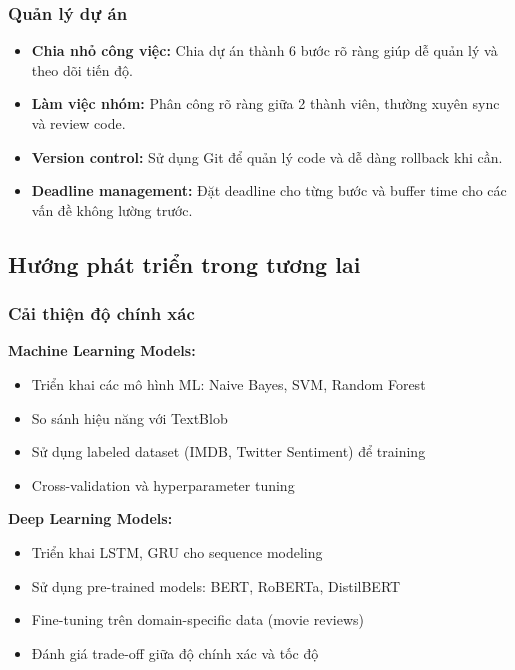 \subsubsection{Quản lý dự án}
\begin{itemize}
    \item \textbf{Chia nhỏ công việc:} Chia dự án thành 6 bước rõ ràng giúp dễ quản lý và theo dõi tiến độ.
    
    \item \textbf{Làm việc nhóm:} Phân công rõ ràng giữa 2 thành viên, thường xuyên sync và review code.
    
    \item \textbf{Version control:} Sử dụng Git để quản lý code và dễ dàng rollback khi cần.
    
    \item \textbf{Deadline management:} Đặt deadline cho từng bước và buffer time cho các vấn đề không lường trước.
\end{itemize}

\subsection{Hướng phát triển trong tương lai}

\subsubsection{Cải thiện độ chính xác}

\textbf{Machine Learning Models:}
\begin{itemize}
    \item Triển khai các mô hình ML: Naive Bayes, SVM, Random Forest
    \item So sánh hiệu năng với TextBlob
    \item Sử dụng labeled dataset (IMDB, Twitter Sentiment) để training
    \item Cross-validation và hyperparameter tuning
\end{itemize}

\textbf{Deep Learning Models:}
\begin{itemize}
    \item Triển khai LSTM, GRU cho sequence modeling
    \item Sử dụng pre-trained models: BERT, RoBERTa, DistilBERT
    \item Fine-tuning trên domain-specific data (movie reviews)
    \item Đánh giá trade-off giữa độ chính xác và tốc độ
\end{itemize}

